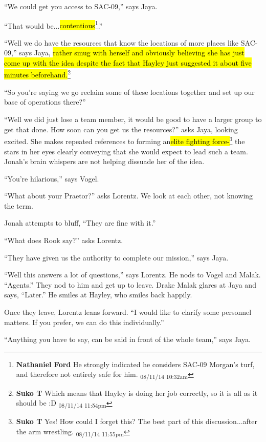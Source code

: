 ``We could get you access to SAC-09,'' says Jaya.

``That would be...\hl{contentious}\footnote{\textbf{Nathaniel Ford }He strongly indicated he considers SAC-09 Morgan's turf, and therefore not entirely safe for him. \textsubscript{08/11/14 10:32am}}.''

``Well we do have the resources that know the locations of more places like SAC-09,'' says Jaya, \hl{rather smug with herself and obviously believing she has just come up with the idea despite the fact that Hayley just suggested it about five minutes beforehand.}\footnote{\textbf{Suko T }Which means that Hayley is doing her job correctly, so it is all as it should be :D \textsubscript{08/11/14 11:54pm}} 

``So you're saying we go reclaim some of these locations together and set up our base of operations there?''

``Well we did just lose a team member, it would be good to have a larger group to get that done.  How soon can you get us the resources?'' asks Jaya, looking excited.  She makes repeated references to forming an\hl{elite fighting force-}\footnote{\textbf{Suko T }Yes!  How could I forget this?  The best part of this discussion...after the arm wrestling. \textsubscript{08/11/14 11:55pm}} the stars in her eyes clearly conveying that she would expect to lead such a team.  Jonah's brain whispers are not helping dissuade her of the idea. 

``You're hilarious,'' says Vogel.

``What about your Praetor?'' asks Lorentz.  We look at each other, not knowing the term.  

Jonah attempts to bluff, ``They are fine with it.''

``What does Rook say?'' asks Lorentz.

``They have given us the authority to complete our mission,'' says Jaya.

``Well this answers a lot of questions,'' says Lorentz.  He nods to Vogel and Malak.  ``Agents.''  They nod to him and get up to leave.  Drake Malak glares at Jaya and says, ``Later.''  He smiles at Hayley, who smiles back happily.



Once they leave, Lorentz leans forward.  ``I would like to clarify some personnel matters.  If you prefer, we can do this individually.''

``Anything you have to say, can be said in front of the whole team,'' says Jaya.

